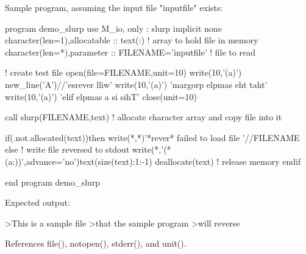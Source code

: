 \begin{DoxyVerb}Sample program, assuming the input file "inputfile" exists:

 program demo_slurp
 use M_io, only      : slurp
 implicit none
 character(len=1),allocatable :: text(:) ! array to hold file in memory
 character(len=*),parameter :: FILENAME='inputfile' ! file to read

 ! create test file
 open(file=FILENAME,unit=10)
 write(10,'(a)') new_line('A')//'esrever lliw'
 write(10,'(a)') 'margorp elpmas eht taht'
 write(10,'(a)') 'elif elpmas a si sihT'
 close(unit=10)

 call slurp(FILENAME,text) ! allocate character array and copy file into it

 if(.not.allocated(text))then
    write(*,*)'*rever* failed to load file '//FILENAME
 else
    ! write file reversed to stdout
    write(*,'(*(a:))',advance='no')text(size(text):1:-1)
    deallocate(text)  ! release memory
 endif

 end program demo_slurp

Expected output:

 >This is a sample file
 >that the sample program
 >will reverse \end{DoxyVerb}
 

References file(), notopen(), stderr(), and unit().

